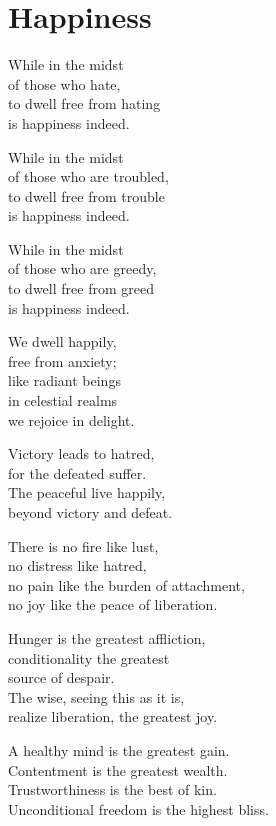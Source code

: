 
\chapter{Happiness}


While in the midst\\
of those who hate,\\
to dwell free from hating\\
is happiness indeed.


While in the midst\\
of those who are troubled,\\
to dwell free from trouble\\
is happiness indeed.


While in the midst\\
of those who are greedy,\\
to dwell free from greed\\
is happiness indeed.


We dwell happily,\\
free from anxiety;\\
like radiant beings\\
in celestial realms\\
we rejoice in delight.


Victory leads to hatred,\\
for the defeated suffer.\\
The peaceful live happily,\\
beyond victory and defeat.


There is no fire like lust,\\
no distress like hatred,\\
no pain like the burden of attachment,\\
no joy like the peace of liberation.


Hunger is the greatest affliction,\\
conditionality the greatest\\
source of despair.\\
The wise, seeing this as it is,\\
realize liberation, the greatest joy.

A healthy mind is the greatest gain.\\
Contentment is the greatest wealth.\\
Trustworthiness is the best of kin.\\
Unconditional freedom is the highest bliss.


